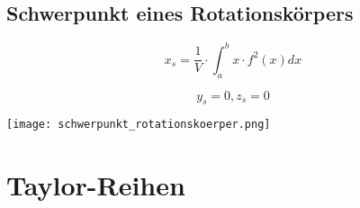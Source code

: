 \begin{multicols*}{3}
    \subsection{Schwerpunkt eines Rotationskörpers}

    \begin{multicols}{2}

        {$$x_s =\frac{1}{V}\cdot \int_{a}^{b}x \cdot f^2(x)dx$$}

        {$$y_s = 0 , z_s = 0$$}

        \columnbreak
        \texttt{[image: schwerpunkt\_rotationskoerper.png]}

    \end{multicols}


    \section{Taylor-Reihen}

    \WhiteSpace

    \mbox{}

\end{multicols*}


